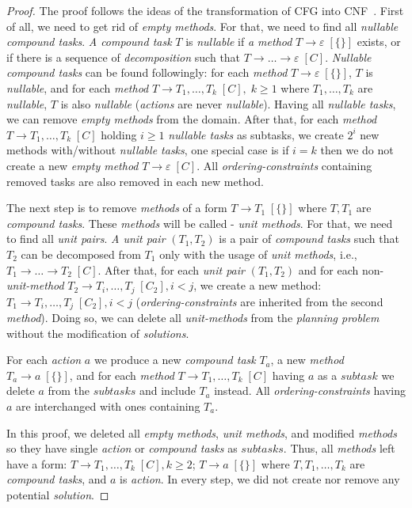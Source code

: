 \begin{proof}
    The proof follows the ideas of the transformation of CFG into CNF~\cite{chytil}. First of all, we need to get rid of \emph{empty methods}. For that, we need to find all \emph{nullable compound tasks}. \emph{A compound task} $T$ is \emph{nullable} if \emph{a method} $T \rightarrow \varepsilon \; [\{\}]$ exists, or if there is a sequence of \emph{decomposition} such that $T \rightarrow \dots \rightarrow \varepsilon \; [C]$. \emph{Nullable compound tasks} can be found followingly: for each \emph{method} $T \rightarrow \varepsilon \; [\{\}]$, $T$ is \emph{nullable}, and for each \emph{method} $T \rightarrow T_1, \dots, T_k \; [C], \; k \geq 1$ where $T_1, \dots, T_k$ are \emph{nullable}, $T$ is also \emph{nullable} (\emph{actions} are never \emph{nullable}). Having all \emph{nullable tasks}, we can remove \emph{empty methods} from the domain. After that, for each \emph{method} $T \rightarrow T_1, \dots, T_k \; [C]$ holding $i \geq 1$ \emph{nullable tasks} as subtasks, we create $2^i$ new methods with/without \emph{nullable tasks}, one special case is if $i = k$ then we do not create a new \emph{empty method} $T \rightarrow \varepsilon \; [C]$. All \emph{ordering-constraints} containing removed tasks are also removed in each new method. 
    
    The next step is to remove \emph{methods} of a form $T \rightarrow T_1 \; [\{\}]$ where $T, T_1$ are \emph{compound tasks}. These \emph{methods} will be called - \emph{unit methods}. For that, we need to find all \emph{unit pairs}. \emph{A unit pair} $(T_1, T_2)$ is a pair of \emph{compound tasks} such that $T_2$ can be decomposed from $T_1$ only with the usage of \emph{unit methods}, i.e., $T_1 \rightarrow \dots \rightarrow T_2 \; [C]$. After that, for each \emph{unit pair} $(T_1, T_2)$ and for each non-\emph{unit-method} $T_2 \rightarrow T_i, \dots, T_j \; [C_2], i < j$, we create a new method: $T_1 \rightarrow T_i, \dots, T_j \; [C_2], i < j$ (\emph{ordering-constraints} are inherited from the second \emph{method}). Doing so, we can delete all \emph{unit-methods} from the \emph{planning problem} without the modification of \emph{solutions}.

    For each \emph{action} $a$ we produce a new \emph{compound task} $T_a$, a new \emph{method} $T_a \rightarrow a \; [\{\}]$, and for each \emph{method} $T \rightarrow T_1, \dots, T_k \; [C]$ having $a$ as a $subtask$ we delete $a$ from the $subtasks$ and include $T_a$ instead. All \emph{ordering-constraints} having $a$ are interchanged with ones containing $T_a$. 

    In this proof, we deleted all \emph{empty methods}, \emph{unit methods}, and modified \emph{methods} so they have single \emph{action} or \emph{compound tasks} as $subtasks$. Thus, all \emph{methods} left have a form: $T \rightarrow T_1, \dots, T_k \; [C], k \geq 2$; $T \rightarrow a \; [\{\}]$ where $T, T_1, \dots, T_k$ are \emph{compound tasks}, and $a$ is \emph{action}. In every step, we did not create nor remove any potential \emph{solution}.
\end{proof}

